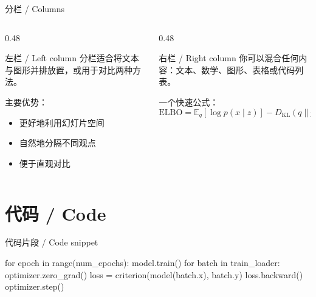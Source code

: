 \documentclass[aspectratio=169]{beamer}
\begin{document}
\begin{frame}{分栏 / Columns}
    \begin{columns}[T]
        \begin{column}{0.48\textwidth}
            \begin{problock}{左栏 / Left column}
                分栏适合将文本与图形并排放置，或用于对比两种方法。
            \end{problock}

            \vspace{0.2cm}
            主要优势：
            \begin{itemize}
                \item 更好地利用幻灯片空间
                \item 自然地分隔不同观点
                \item 便于直观对比
            \end{itemize}
        \end{column}

        \begin{column}{0.48\textwidth}
            \begin{problock}{右栏 / Right column}
                你可以混合任何内容：文本、数学、图形、表格或代码列表。
            \end{problock}

            \vspace{0.2cm}
            一个快速公式：
            \[
                \text{ELBO} = \mathbb{E}_{q}[\log p(x \mid z)]
                - D_{\text{KL}}(q \| p)
            \]
        \end{column}
    \end{columns}
\end{frame}

\section{代码 / Code}


\begin{frame}[fragile]{代码片段 / Code snippet}
    \begin{jqcodebox}[language=Python, title=训练循环 / Training loop]
for epoch in range(num_epochs):
    model.train()
    for batch in train_loader:
        optimizer.zero_grad()
        loss = criterion(model(batch.x), batch.y)
        loss.backward()
        optimizer.step()
    \end{jqcodebox}
\end{frame}
\end{document}
